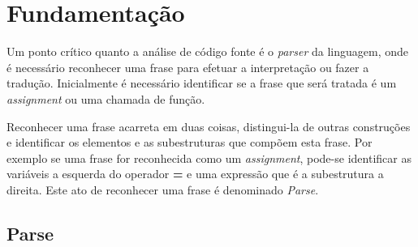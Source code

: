 %
%
\chapter{Fundamentação}
Um ponto crítico quanto a análise de código fonte é o \textit{parser} da linguagem, onde é necessário reconhecer uma frase para efetuar a interpretação ou fazer a tradução. Inicialmente é necessário identificar se a frase que será tratada é um \textit{assignment} ou uma chamada de função.
 
Reconhecer uma frase acarreta em duas coisas, distingui-la de outras construções e identificar os elementos e as subestruturas que compõem esta frase. Por exemplo se uma frase for reconhecida como um \textit{assignment}, pode-se identificar as variáveis a esquerda do operador \textbf{=} e uma expressão que é a subestrutura a direita. Este ato de reconhecer uma frase é denominado \textit{Parse}.

\section{Parse}

